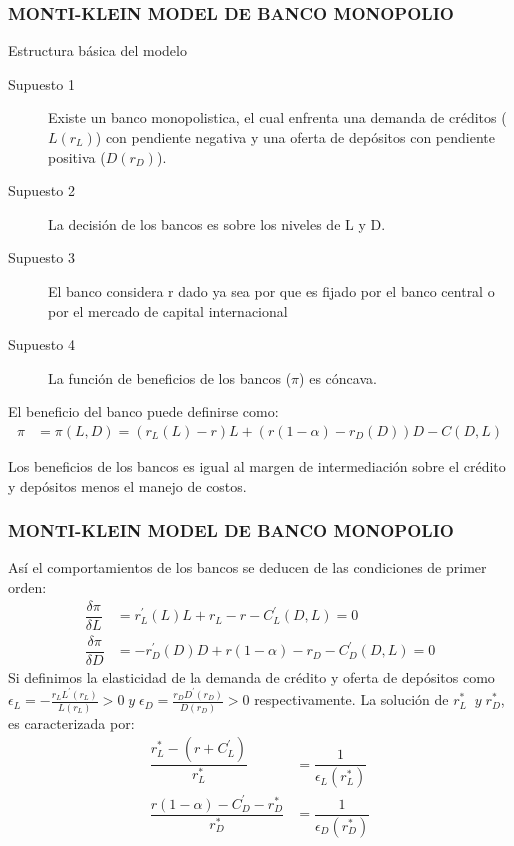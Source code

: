 
\begin{frame}
    \frametitle{{\normalsize MONTI-KLEIN MODEL DE BANCO MONOPOLIO} {}}
    \setcounter{equation}{0}
    \begin{block} {Estructura básica del modelo}
        \begin{description}
            \item[Supuesto 1]  Existe un banco monopolistica, el cual enfrenta una demanda de créditos ($L(r_{L})$) con pendiente negativa y una oferta de depósitos con pendiente positiva ($D(r_{D})$).
            \item[Supuesto 2] La decisión de los bancos es sobre los niveles de L y D.
            \item[Supuesto 3] El banco considera r dado ya sea por que es fijado por el banco central o por el mercado de capital internacional  
            \item[Supuesto 4] La función de beneficios de los bancos ($\pi $) es cóncava.     
        \end{description}
        
    \end{block}	
    
    
    El beneficio del banco puede definirse como:
    \begin{align}
    \pi&=\pi(L, D)=(r_{L}(L)-r)L+(r(1-\alpha)-r_{D}(D))D-C(D,L) 
    \end{align}   
    
    Los beneficios de los bancos es igual al margen de intermediación sobre el crédito y depósitos menos el manejo de costos. 
\end{frame}

\begin{frame}
    \frametitle{{\normalsize MONTI-KLEIN MODEL DE BANCO MONOPOLIO} {}}
    
    Así el comportamientos de los bancos se deducen de las condiciones de primer orden:
    \begin{align}
    \dfrac{\delta \pi}{\delta L}&=r_{L}^{'}(L)L+r_{L}-r-C_{L}^{'}(D,L)=0  \\
    \dfrac{\delta \pi}{\delta D}&=-r_{D}^{'}(D)D+r(1-\alpha)-r_{D}-C_{D}^{'}(D,L)=0  
    \end{align} 
    Si definimos la elasticidad de la demanda de crédito y oferta de depósitos como $\epsilon_{L}=-\frac{r_{L}L^{'}(r_{L})}{L(r_{L})}>0   \; y \; \epsilon_{D}=\frac{r_{D}D^{'}(r_{D})}{D(r_{D})}>0$
    respectivamente. La solución de $r_{L}^{*}\; \; y \; r_{D}^{*}$, es caracterizada por:
    \begin{align}
    \dfrac{r_{L}^{*}-(r+C_{L}^{'})}{r_{L}^{*}}&=\dfrac{1}{\epsilon_{L}(r_{L}^{*})}  \\
    \dfrac{r(1-\alpha)-C_{D}^{'}-r_{D}^{*}}{r_{D}^{*}}&=\dfrac{1}{\epsilon_{D}(r_{D}^{*})}  
    \end{align} 
    
    
    
\end{frame}



